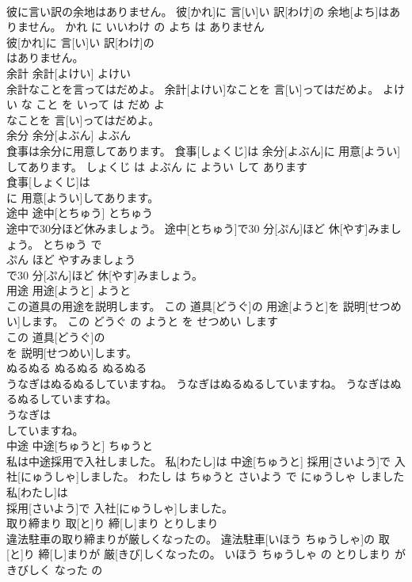 \documentclass[8pt]{extreport}
\begin{document}
\begin{CJK}{UTF8}{min}
\\	彼に言い訳の余地はありません。	彼[かれ]に 言[い]い 訳[わけ]の 余地[よち]はありません。	かれ に いいわけ の よち は ありません	
\\	彼[かれ]に 言[い]い 訳[わけ]の
\\	はありません。			
\\	余計	余計[よけい]	よけい	
\\	余計なことを言ってはだめよ。	余計[よけい]なことを 言[い]ってはだめよ。	よけい な こと を いって は だめ よ	
\\	なことを 言[い]ってはだめよ。			
\\	余分	余分[よぶん]	よぶん	
\\	食事は余分に用意してあります。	食事[しょくじ]は 余分[よぶん]に 用意[ようい]してあります。	しょくじ は よぶん に ようい して あります	
\\	食事[しょくじ]は
\\	に 用意[ようい]してあります。			
\\	途中	途中[とちゅう]	とちゅう	
\\	途中で30分ほど休みましょう。	途中[とちゅう]で30 分[ぷん]ほど 休[やす]みましょう。	とちゅう で 
\\	ぷん ほど やすみましょう	
\\	で30 分[ぷん]ほど 休[やす]みましょう。			
\\	用途	用途[ようと]	ようと	
\\	この道具の用途を説明します。	この 道具[どうぐ]の 用途[ようと]を 説明[せつめい]します。	この どうぐ の ようと を せつめい します	
\\	この 道具[どうぐ]の
\\	を 説明[せつめい]します。			
\\	ぬるぬる	ぬるぬる	ぬるぬる	
\\	うなぎはぬるぬるしていますね。	うなぎはぬるぬるしていますね。	うなぎはぬるぬるしていますね。	
\\	うなぎは
\\	していますね。			
\\	中途	中途[ちゅうと]	ちゅうと	
\\	私は中途採用で入社しました。	私[わたし]は 中途[ちゅうと] 採用[さいよう]で 入社[にゅうしゃ]しました。	わたし は ちゅうと さいよう で にゅうしゃ しました	
\\	私[わたし]は
\\	採用[さいよう]で 入社[にゅうしゃ]しました。			
\\	取り締まり	取[と]り 締[し]まり	とりしまり	
\\	違法駐車の取り締まりが厳しくなったの。	違法駐車[いほう ちゅうしゃ]の 取[と]り 締[し]まりが 厳[きび]しくなったの。	いほう ちゅうしゃ の とりしまり が きびしく なった の	

\end{CJK}
\end{document}
